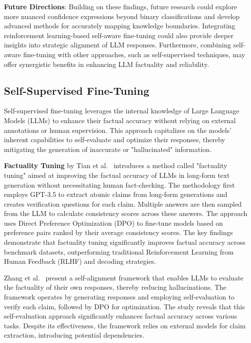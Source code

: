 \documentclass{article}
\begin{document}
\textbf{Future Directions}: Building on these findings, future research could explore more nuanced confidence expressions beyond binary classifications and develop advanced methods for accurately mapping knowledge boundaries. Integrating reinforcement learning-based self-aware fine-tuning could also provide deeper insights into strategic alignment of LLM responses. Furthermore, combining self-aware fine-tuning with other approaches, such as self-supervised techniques, may offer synergistic benefits in enhancing LLM factuality and reliability.

\subsection{Self-Supervised Fine-Tuning}
\label{sec:self_supervised}

Self-supervised fine-tuning leverages the internal knowledge of Large Language Models (LLMs) to enhance their factual accuracy without relying on external annotations or human supervision. This approach capitalizes on the models' inherent capabilities to self-evaluate and optimize their responses, thereby mitigating the generation of inaccurate or "hallucinated" information.

\textbf{Factuality Tuning} by Tian et al.~\cite{tianFinetuningLanguageModels2023} introduces a method called "factuality tuning" aimed at improving the factual accuracy of LLMs in long-form text generation without necessitating human fact-checking. The methodology first employs GPT-3.5 to extract atomic claims from long-form generations and creates verification questions for each claim. Multiple answers are then sampled from the LLM to calculate consistency scores across these answers. The approach uses Direct Preference Optimization (DPO) to fine-tune models based on preference pairs ranked by their average consistency scores. The key findings demonstrate that factuality tuning significantly improves factual accuracy across benchmark datasets, outperforming traditional Reinforcement Learning from Human Feedback (RLHF) and decoding strategies.

Zhang et al.~\cite{SelfAlignmentFactualityMitigatingHallucinationsLLMs2024} present a self-alignment framework that enables LLMs to evaluate the factuality of their own responses, thereby reducing hallucinations. The framework operates by generating responses and employing self-evaluation to verify each claim, followed by DPO for optimization. The study reveals that this self-evaluation approach significantly enhances factual accuracy across various tasks. Despite its effectiveness, the framework relies on external models for claim extraction, introducing potential dependencies.
\end{document}
